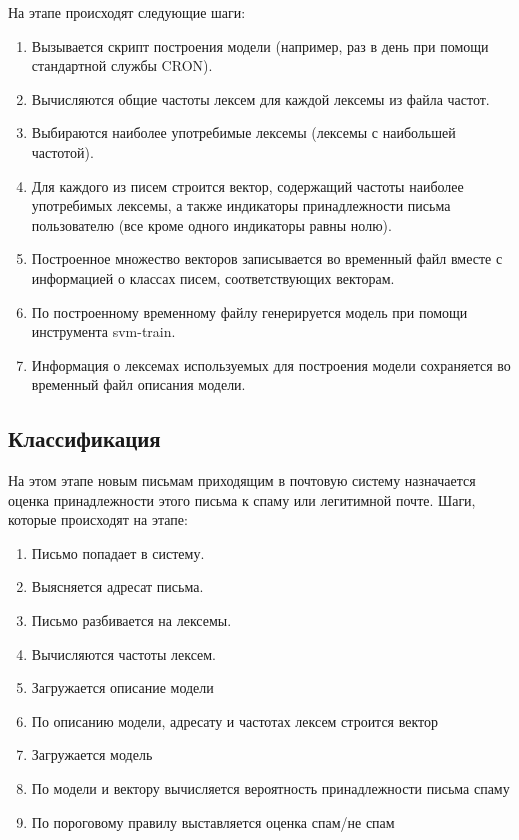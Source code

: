 На этапе происходят следующие шаги:
\begin{enumerate}
    \item Вызывается скрипт построения модели (например, раз в день при помощи стандартной службы CRON).
    \item Вычисляются общие частоты лексем для каждой лексемы из файла частот.
    \item Выбираются наиболее употребимые лексемы (лексемы с наибольшей частотой).
    \item Для каждого из писем строится вектор, содержащий частоты наиболее употребимых лексемы, а также индикаторы принадлежности письма пользователю (все кроме одного индикаторы равны нолю).
    \item Построенное множество векторов записывается во временный файл вместе с информацией о классах писем,  соответствующих векторам.
    \item По построенному временному файлу генерируется модель при помощи инструмента svm-train.
    \item Информация о лексемах используемых для построения модели сохраняется во временный файл описания модели.
\end{enumerate}

\subsection{Классификация}
На этом этапе новым письмам приходящим в почтовую систему назначается оценка принадлежности этого письма к спаму или легитимной почте.
Шаги, которые происходят на этапе:
\begin{enumerate}
    \item Письмо попадает в систему.
    \item Выясняется адресат письма.
    \item Письмо разбивается на лексемы.
    \item Вычисляются частоты лексем.
    \item Загружается описание модели
    \item По описанию модели, адресату и частотах лексем строится вектор
    \item Загружается модель
    \item По модели и вектору вычисляется вероятность принадлежности письма спаму
    \item По пороговому правилу выставляется оценка спам/не спам
\end{enumerate}

